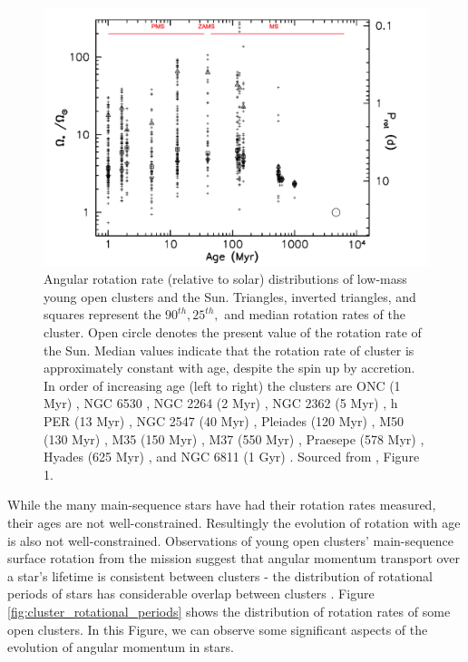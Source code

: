 \begin{figure}
    \includegraphics[width=\textwidth]{Figures/intro_figures/pms_evo.png}
    \caption{Angular rotation rate (relative to solar) distributions of low-mass young open clusters and the Sun. Triangles, inverted triangles, and squares represent the $90^{th}, 25^{th},$ and median rotation rates of the cluster. Open circle denotes the present value of the rotation rate of the Sun. Median values indicate that the rotation rate of cluster is approximately constant with age, despite the spin up by accretion. In order of increasing age (left to right) the clusters are ONC (1 Myr) \citep{herbst_stellar_2002}, NGC 6530 \citep{henderson_time-series_2012}, NGC 2264 (2 Myr) \citep{affer_rotation_2013}, NGC 2362 (5 Myr) \citep{irwin_monitor_2008}, h PER (13 Myr) \citep{moraux_monitor_2013}, NGC 2547 (40 Myr) \citep{irwin_monitor_2008}, Pleiades (120 Myr) \citep{hartman_large_2010}, M50 (130 Myr) \citep{irwin_monitor_2009}, M35 (150 Myr) \citep{meibom_slar_2009}, M37 (550 Myr) \citep{hartman_deep_2009}, Praesepe (578 Myr) \citep{delorme_stellar_2011}, Hyades (625 Myr) \citep{delorme_stellar_2011}, and NGC 6811 (1 Gyr) \citep{meibom_kepler_2011}.  Sourced from \citet{gallet_improved_2013},  Figure 1.}
    \label{fig:pms_ms_evo}
\end{figure}

While the many main-sequence stars have had their rotation rates measured, their ages are not well-constrained.
Resultingly the evolution of rotation with age is also not well-constrained.
Observations of young open clusters' main-sequence surface rotation from the \kepler{} mission suggest that angular momentum transport over a star's lifetime is consistent between clusters - the distribution of rotational periods of stars has considerable overlap between clusters \citep{spina_how_2020, curtis_when_2020}. 
Figure \ref{fig:cluster_rotational_periods} shows the distribution of rotation rates of some open clusters.
In this Figure, we can observe some significant aspects of the evolution of angular momentum in stars.

